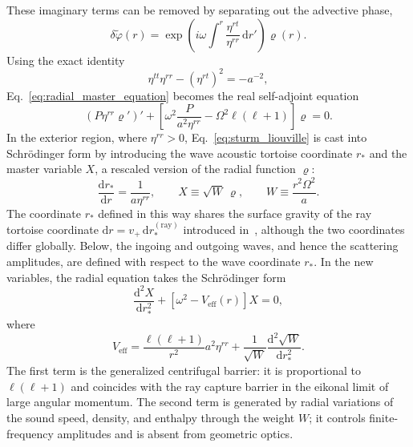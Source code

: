 \documentclass[12pt,a4paper,preprint,nopreprintline]{elsarticle}
\begin{document}
These imaginary terms can be removed by separating out the advective phase,
\begin{equation}
    \delta\widetilde{\varphi}(r)=
    \exp\left(i\omega\int^{r}\frac{\eta^{rt}}{\eta^{rr}}\,\mathrm{d}r'\right)\varrho(r).
    \label{eq:phase_transformation}
\end{equation}
Using the exact identity
\begin{equation}
    \eta^{tt}\eta^{rr}-(\eta^{rt})^{2}=-a^{-2},
    \label{eq:core_determinant}
\end{equation}
Eq.~\eqref{eq:radial_master_equation} becomes the real self-adjoint equation
\begin{equation}
    \left(P\eta^{rr}\varrho'\right)'
    +
    \left[
        \omega^{2}\frac{P}{a^{2}\eta^{rr}}
        -\Omega^{2}\ell(\ell+1)
    \right]\varrho=0.
    \label{eq:sturm_liouville}
\end{equation}
In the exterior region, where $\eta^{rr}>0$, Eq.~\eqref{eq:sturm_liouville} is cast into Schr\"odinger form by introducing the wave acoustic tortoise coordinate $r_{*}$ and the master variable $X$, a rescaled version of the radial function $\varrho$:
\begin{equation}
    \frac{\mathrm{d}r_{*}}{\mathrm{d}r}
    =
    \frac{1}{a\eta^{rr}},
    \qquad
    X\equiv\sqrt{W}\,\varrho,
    \qquad
    W\equiv\frac{r^{2}\Omega^{2}}{a}.
    \label{eq:tortoise_rescaling}
\end{equation}
The coordinate $r_{*}$ defined in this way shares the surface gravity of the ray tortoise coordinate $\mathrm{d}r=v_{+}\,\mathrm{d}r_{*}^{\mathrm{(ray)}}$ introduced in~\cite{SemyannikovAV_AcousticGeometryAndSoundRayDynamics_2026}, although the two coordinates differ globally. Below, the ingoing and outgoing waves, and hence the scattering amplitudes, are defined with respect to the wave coordinate $r_{*}$. In the new variables, the radial equation takes the Schr\"odinger form
\begin{equation}
    \frac{\mathrm{d}^{2}X}{\mathrm{d}r_{*}^{2}}
    +
    \left[\omega^{2}-V_{\mathrm{eff}}(r)\right]X=0,
    \label{eq:schrodinger_equation}
\end{equation}
where
\begin{equation}
    V_{\mathrm{eff}}
    =
    \frac{\ell(\ell+1)}{r^{2}}a^{2}\eta^{rr}
    +
    \frac{1}{\sqrt{W}}
    \frac{\mathrm{d}^{2}\sqrt{W}}{\mathrm{d}r_{*}^{2}}.
    \label{eq:effective_potential}
\end{equation}
The first term is the generalized centrifugal barrier: it is proportional to $\ell(\ell+1)$ and coincides with the ray capture barrier in the eikonal limit of large angular momentum. The second term is generated by radial variations of the sound speed, density, and enthalpy through the weight $W$; it controls finite-frequency amplitudes and is absent from geometric optics.
\end{document}
